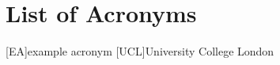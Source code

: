 
\chapter*{List of Acronyms}

\makeatletter
\patchcmd{\AC@@acro}{] #3}{] \MakeUppercase #3}{}{}
\patchcmd{\AC@@acro}{] #3}{] \MakeUppercase #3}{}{}
\makeatother
\begin{acronym}
  [EA]{example acronym}
  [UCL]{University College London}
\end{acronym}


